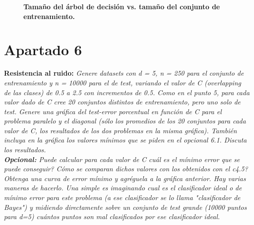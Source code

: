 \documentclass[a4paper, 11pt]{article} %
\begin{document}
\begin{figure}[H]
\captionsetup[subfigure]{labelformat=empty}
  \centering
  \caption*{\textbf{Tamaño del árbol de decisión vs. tamaño del conjunto de entrenamiento.}}
\end{figure}


\section*{Apartado 6}  
\textbf{Resistencia al ruido:} \textit{Genere datasets con d = 5, n = 250 para
el conjunto de entrenamiento y n = 10000 para el de test, variando el valor de
C (overlapping de las clases) de 0.5 a 2.5 con incrementos de 0.5. Como en el
punto 5, para cada valor dado de C cree 20 conjuntos distintos de
entrenamiento, pero uno solo de test.  Genere una gráfica del test-error
porcentual en función de C para el problema paralelo y el diagonal (sólo los
promedios de los 20 conjuntos para cada valor de C, los resultados de los dos
problemas en la misma gráfica). También incluya en la gráfica los valores
mínimos que se piden en el opcional 6.1.  Discuta los resultados.\\
\textbf{Opcional: }Puede calcular para cada valor de C cuál es el mínimo error
que se puede conseguir? Cómo se comparan dichos valores con los obtenidos con
el c4.5?  Obtenga una curva de error mínimo y agréguela a la gráfica anterior.
Hay varias maneras de hacerlo. Una simple es imaginando cual es el clasificador
ideal o de mínimo error para este problema (a ese clasificador se lo llama
"clasificador de Bayes") y midiendo directamente sobre un conjunto de test
grande (10000 puntos para d=5) cuántos puntos son mal clasificados por ese
clasificador ideal.}\\
\end{document}
